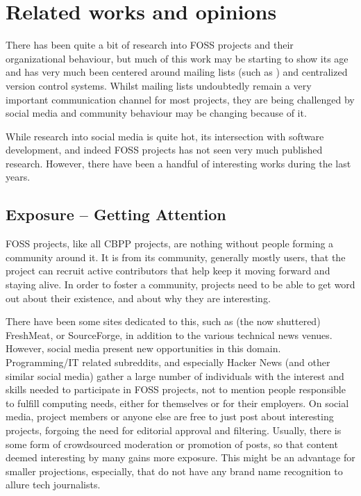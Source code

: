 \documentclass[a4paper,11pt]{article} %
\begin{document}
\section{Related works and opinions}
There has been quite a bit of research into FOSS projects and their
organizational behaviour, but much of this work may be starting to show its
age and has very much been centered around mailing lists (such as
\cite{Oezbek10Cancer, singh2011network}) and centralized version control
systems. Whilst mailing lists undoubtedly remain a very important
communication channel for most projects, they are being challenged by social
media and community behaviour may be changing because of it.

While research into social media is quite hot, its intersection with
software development, and indeed FOSS projects has not seen very much
published research. However, there have been a handful of interesting works
during the last years.

\subsection{Exposure -- Getting Attention}
FOSS projects, like all CBPP projects, are nothing without people
forming a community around it. It is from its community, generally
mostly users, that the project can recruit active contributors that
help keep it moving forward and staying alive. In order to foster a
community, projects need to be able to get word out about their
existence, and about why they are interesting.

There have been some sites dedicated to this, such as (the now
shuttered) FreshMeat, or SourceForge, in addition to the various
technical news venues. However, social media present new opportunities
in this domain. Programming/IT related subreddits, and especially
Hacker News (and other similar social media) gather a large number of
individuals with the interest and skills needed to participate in FOSS
projects, not to mention people responsible to fulfill computing
needs, either for themselves or for their employers.  On social media,
project members or anyone else are free to just post about interesting
projects, forgoing the need for editorial approval and
filtering. Usually, there is some form of crowdsourced moderation or
promotion of posts, so that content deemed interesting by many gains
more exposure. This might be an advantage for smaller projections,
especially, that do not have any brand name recognition to allure tech
journalists.
\end{document}
